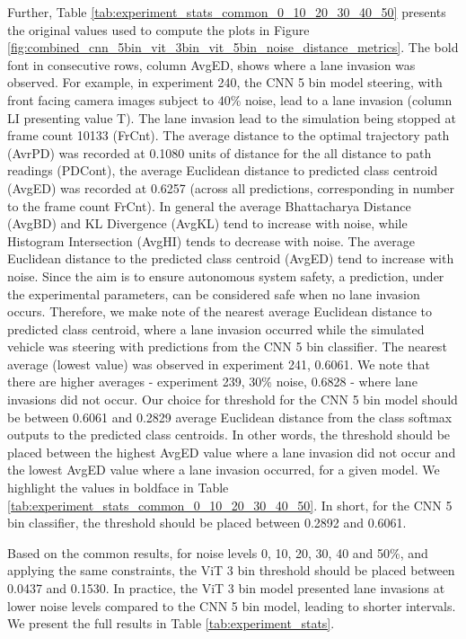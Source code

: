 Further, Table \ref{tab:experiment_stats_common_0_10_20_30_40_50} presents the original values used to compute the plots in Figure \ref{fig:combined_cnn_5bin_vit_3bin_vit_5bin_noise_distance_metrics}. The bold font in consecutive rows, column AvgED, shows where a lane invasion was observed. For example, in experiment 240, the CNN 5 bin model steering, with front facing camera images subject to 40\% noise, lead to a lane invasion (column LI presenting value T). The lane invasion lead to the simulation being stopped at frame count 10133 (FrCnt). The average distance to the optimal trajectory path (AvrPD) was recorded at 0.1080 units of distance for the all distance to path readings (PDCont), the average Euclidean distance to predicted class centroid (AvgED) was recorded at 0.6257 (across all predictions, corresponding in number to the frame count FrCnt). In general the average Bhattacharya Distance (AvgBD) and KL Divergence (AvgKL) tend to increase with noise, while Histogram Intersection (AvgHI) tends to decrease with noise.
The average Euclidean distance to the predicted class centroid (AvgED) tend to increase with noise. 
Since the aim is to ensure autonomous system safety, a prediction, under the experimental parameters, can be considered safe when no lane invasion occurs. Therefore, we make note of the nearest average Euclidean distance to predicted class centroid, where a lane invasion occurred while the simulated vehicle was steering with predictions from the CNN 5 bin classifier. The nearest average (lowest value) was observed in experiment 241, 0.6061. We note that there are higher averages - experiment 239, 30\% noise, 0.6828 - where lane invasions did not occur. Our choice for threshold for the CNN 5 bin model should be between 0.6061 and 0.2829 average Euclidean distance from the class softmax outputs to the predicted class centroids. In other words, the threshold should be placed between the highest AvgED value where a lane invasion did not occur and the lowest AvgED value where a lane invasion occurred, for a given model. We highlight the values in boldface in Table \ref{tab:experiment_stats_common_0_10_20_30_40_50}. In short, for the CNN 5 bin classifier, the threshold should be placed between 0.2892 and 0.6061. 

Based on the common results, for noise levels 0, 10, 20, 30, 40 and 50\%, and applying the same constraints, the ViT 3 bin threshold should be placed between 0.0437 and 0.1530. In practice, the ViT 3 bin model presented lane invasions at lower noise levels compared to the CNN 5 bin model, leading to shorter intervals. 
We present the full results in Table \ref{tab:experiment_stats}.


